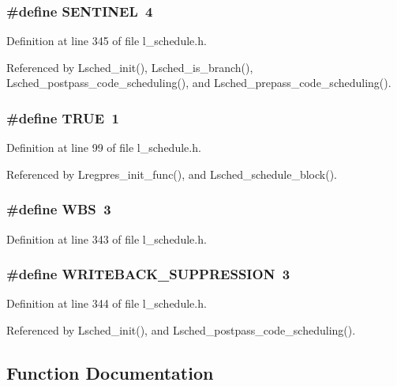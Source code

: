 \subsubsection{\setlength{\rightskip}{0pt plus 5cm}\#define SENTINEL~4}\label{l__schedule_8h_f2af475b85aef66019c417d8ded1c435}




Definition at line 345 of file l\_\-schedule.h.

Referenced by Lsched\_\-init(), Lsched\_\-is\_\-branch(), Lsched\_\-postpass\_\-code\_\-scheduling(), and Lsched\_\-prepass\_\-code\_\-scheduling().
\subsubsection{\setlength{\rightskip}{0pt plus 5cm}\#define \bf{TRUE}~1}\label{l__schedule_8h_a8cecfc5c5c054d2875c03e77b7be15d}




Definition at line 99 of file l\_\-schedule.h.

Referenced by Lregpres\_\-init\_\-func(), and Lsched\_\-schedule\_\-block().
\subsubsection{\setlength{\rightskip}{0pt plus 5cm}\#define WBS~3}\label{l__schedule_8h_dbd0f0983d6aee1cc17996ba6dd3889d}




Definition at line 343 of file l\_\-schedule.h.
\subsubsection{\setlength{\rightskip}{0pt plus 5cm}\#define WRITEBACK\_\-SUPPRESSION~3}\label{l__schedule_8h_50d2ac1e0a4ce3cd20af118f81481136}




Definition at line 344 of file l\_\-schedule.h.

Referenced by Lsched\_\-init(), and Lsched\_\-postpass\_\-code\_\-scheduling().

\subsection{Function Documentation}
